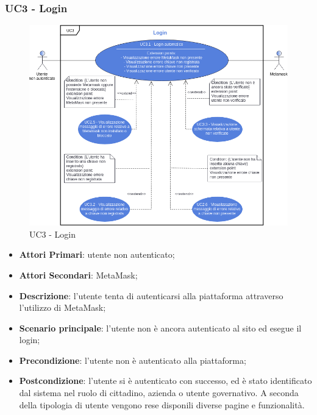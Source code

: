 \subsubsection{UC3 - Login}
\begin{figure}[h]
	\includegraphics[width=12cm]{res/images/UC3Login.png} %
	\centering
	\caption{UC3 - Login}
	
\end{figure}
\begin{itemize}
	\item \textbf{Attori Primari}:
	utente non autenticato;
	\item \textbf{Attori Secondari}:
	MetaMask\glo;
	\item \textbf{Descrizione}:
	l'utente tenta di autenticarsi alla piattaforma attraverso l'utilizzo di MetaMask\glo;
	\item \textbf{Scenario principale}:
	l'utente non è ancora autenticato al sito ed esegue il login;
	\item \textbf{Precondizione}:
	l'utente non è autenticato alla piattaforma;
	\item \textbf{Postcondizione}:
	l'utente si è autenticato con successo, ed è stato identificato dal sistema nel ruolo di cittadino, azienda o utente governativo. A seconda della tipologia di utente vengono rese disponili diverse pagine e funzionalità.
\end{itemize}
